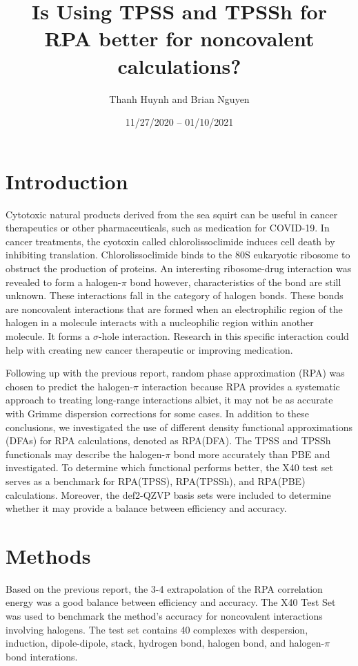 \documentclass[11pt]{article}
\title{\textbf{Is Using TPSS and TPSSh for RPA better for noncovalent
    calculations?}}
\author{Thanh Huynh and Brian Nguyen}
\date{11/27/2020 -- 01/10/2021 }
\begin{document}
\maketitle

\section{Introduction}

Cytotoxic natural products derived from the sea squirt can be useful in cancer
therapeutics or other pharmaceuticals, such as medication
for COVID-19. In cancer treatments, the cyotoxin called chlorolissoclimide induces cell death
by inhibiting translation. Chlorolissoclimide binds to the 80S eukaryotic
ribosome to obstruct the production of proteins. An interesting ribosome-drug
interaction was revealed to form a halogen-$\pi$ bond however,
characteristics of the bond are still unknown. These interactions fall in
the category of halogen bonds. These bonds are noncovalent interactions that
are formed when an electrophilic region of the halogen in a molecule interacts
with a nucleophilic region within another molecule. It forms a $\sigma$-hole
interaction. Research in this specific interaction could help with creating
new cancer therapeutic or improving medication.

Following up with the previous report, random phase approximation (RPA) was
chosen to predict the halogen-$\pi$ interaction because RPA provides a
systematic approach to treating long-range interactions albiet, it may
not be as accurate with Grimme dispersion corrections for some cases. In addition to
these conclusions, we investigated the use of different density functional
approximations (DFAs) for RPA calculations, denoted as RPA(DFA).
The TPSS and TPSSh functionals may describe the halogen-$\pi$ bond more accurately
than PBE and investigated. To determine which functional performs better,
the X40 test set serves as a benchmark for RPA(TPSS), RPA(TPSSh), and
RPA(PBE) calculations. Moreover, the def2-QZVP basis sets were
included to determine whether it may provide a balance between efficiency
and accuracy.

\section{Methods}

Based on the previous report, the 3-4 extrapolation of the RPA
correlation energy was a good balance between efficiency and accuracy.
The X40 Test Set was used to benchmark the method's accuracy for 
noncovalent interactions involving halogens. The test set contains 40
complexes with despersion, induction, dipole-dipole, stack, hydrogen
bond, halogen bond, and halogen-$\pi$ bond interations.
\end{document}
